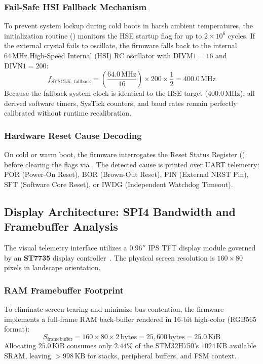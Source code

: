 \subsubsection{Fail-Safe HSI Fallback Mechanism}
To prevent system lockup during cold boots in harsh ambient temperatures, the initialization routine
() monitors the HSE startup flag for up to $2 \times 10^6$ cycles.
If the external crystal fails to oscillate, the firmware falls back to the internal $64\,\text{MHz}$
High-Speed Internal (HSI) RC oscillator with $\text{DIVM1} = 16$ and $\text{DIVN1} = 200$:
\begin{equation}
  f_{\text{SYSCLK, fallback}} = \left(\frac{64.0\,\text{MHz}}{16}\right) \times 200 \times \frac{1}{2} = 400.0\,\text{MHz}
\end{equation}
Because the fallback system clock is identical to the HSE target ($400.0\,\text{MHz}$), all derived software
timers, SysTick counters, and baud rates remain perfectly calibrated without runtime recalibration.

\subsubsection{Hardware Reset Cause Decoding}
On cold or warm boot, the firmware interrogates the Reset Status Register () before clearing
the flags via . The detected cause is printed over UART telemetry:
$\text{POR}$ (Power-On Reset), $\text{BOR}$ (Brown-Out Reset), $\text{PIN}$ (External NRST Pin),
$\text{SFT}$ (Software Core Reset), or $\text{IWDG}$ (Independent Watchdog Timeout).

\subsection{Display Architecture: SPI4 Bandwidth and Framebuffer Analysis}
\label{sec:lcd-calc}

The visual telemetry interface utilizes a $0.96''$ IPS TFT display module governed by an
\textbf{ST7735} display controller~\cite{st7735ds}. The physical screen resolution is $160 \times 80$ pixels
in landscape orientation.

\subsubsection{RAM Framebuffer Footprint}
To eliminate screen tearing and minimize bus contention, the firmware implements a full-frame RAM
back-buffer rendered in 16-bit high-color (RGB565 format):
\begin{equation}
  S_{\text{framebuffer}} = 160 \times 80 \times 2\,\text{bytes} = 25{,}600\,\text{bytes} = 25.0\,\text{KiB}
  \label{eq:fb-size}
\end{equation}
Allocating $25.0\,\text{KiB}$ consumes only $2.44\%$ of the STM32H750's $1024\,\text{KB}$ available SRAM,
leaving $>998\,\text{KB}$ for stacks, peripheral buffers, and FSM context.

